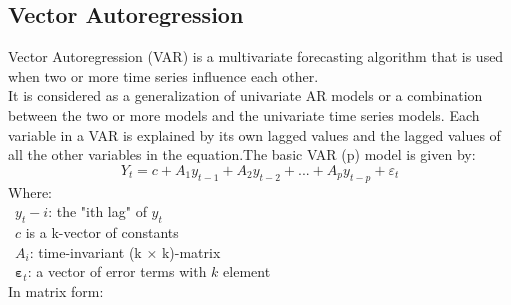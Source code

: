 \documentclass{ieeeojies}
\begin{document}
\subsection{Vector Autoregression}
Vector Autoregression (VAR) is a multivariate forecasting algorithm that is used when two or more time series influence each other. \\
It is considered as a generalization of univariate AR models or a combination between the two or more models and the univariate time series models. Each variable in a VAR is explained by its own lagged values and the lagged values of all the other variables in the equation.The basic VAR (p) model is given by:
\[Y_t=c+A_1y_{t-1}+A_2y_{t-2}+...+A_py_{t-p}+\varepsilon_t\]
Where:\\
\indent\textbullet\ \(y_t-i\): the "ith lag" of \(y_t\)\\
\indent\textbullet\ \(c\) is a k-vector of constants\\
\indent\textbullet\ \(A_i\): time-invariant (k × k)-matrix\\
\indent\textbullet\ \(\boldsymbol{\varepsilon}_t\): a vector of error terms with \(k\) element\\
In matrix form:
\end{document}
